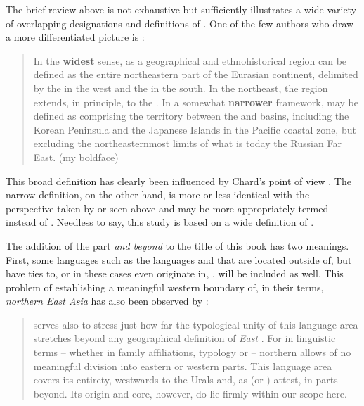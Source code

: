The brief review above is not exhaustive but sufficiently illustrates a wide variety of overlapping designations and definitions of . One of the few authors who draw a more differentiated picture is \citet[284]{Janhunen2010}:

\begin{quote}
In the \textbf{widest} sense,  as a geographical and ethnohistorical region can be defined as the entire northeastern part of the Eurasian continent, delimited by the  in the west and the  in the south. In the northeast, the region extends, in principle, to the . In a somewhat \textbf{narrower} framework,  may be defined as comprising the territory between the  and  basins, including the Korean Peninsula and the Japanese Islands in the Pacific coastal zone, but excluding the northeasternmost limits of what is today the Russian Far East. (my boldface)
\end{quote}

\noindent This broad definition has clearly been influenced by Chard’s point of view \citep[7]{Janhunen1996}. The narrow definition, on the other hand, is more or less identical with the perspective taken by \citet{NarangoaCribbs2014} or \citet{Rawski2015} seen above and may be more appropriately termed \textit{} instead of  \citep[6]{Janhunen1996}. Needless to say, this study is based on a wide definition of .

The addition of the part \textit{and beyond} to the title of this book has two meanings. First, some languages such as the  languages  and  that are located outside of, but have ties to, or in these cases even originate in, , will be included as well. This problem of establishing a meaningful western boundary of, in their terms, \textit{northern East Asia} has also been observed by \citet[873]{HeggartyRenfrew2014b}:

\begin{quote}
 serves also to stress just how far the typological unity of this language area stretches beyond any geographical definition of \textit{East} . For in linguistic terms – whether in family affiliations, typology or  – northern  allows of no meaningful division into eastern or western parts. This language area covers its entirety, westwards to the Urals and, as  (or ) attest, in parts beyond. Its origin and core, however, do lie firmly within our scope here.
\end{quote}

